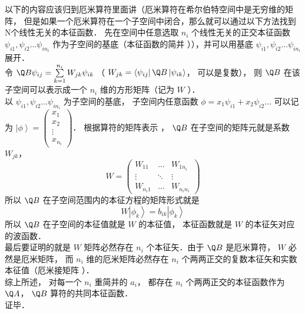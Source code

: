 以下的内容应该归到厄米算符里面讲（厄米算符在希尔伯特空间中是无穷维的矩阵， 但是如果一个厄米算符在一个子空间中闭合，那么就可以通过以下方法找到N个线性无关的本征函数．%
先在空间中任意选取 $n_i$ 个线性无关的正交本征函数 ${\psi _{i1}}, {\psi _{i2}}\dots{\psi _{i{n_i}}}$ 作为子空间的基底（本征函数的简并%
）），并可以用基底 ${\psi _{i1}},{\psi _{i2}}\dots{\psi _{i{n_i}}}$ 展开．\\
令 $\Q B{\psi _{ij}} = \sum\limits_{k = 1}^{{n_i}} {{W_{jk}}{\psi _{ik}}} $ （ ${W_{jk}} = \left\langle {{\psi _{ij}}} \right|\Q B\left| {{\psi _{ik}}} \right\rangle $， 可以是复数）， 则 $\Q B$ 在该子空间可以表示成一个 $n_i$ 维的方形矩阵（记为 $W$ ）．\\
以 ${\psi _{i1}}, {\psi _{i2}}\dots{\psi _{i{n_i}}}$ 为子空间的基底， 子空间内任意函数 $\phi  = {x_1}{\psi _{i1}} + {x_2}{\psi _{i2}}\dots$ 可以记为 $\left| \phi  \right\rangle  = \left( \begin{aligned}
{x_1}\\
{x_2}\\
\vdots \\
{x_{{n_i}}}
\end{aligned} \right)$． 根据算符的矩阵表示%
， $\Q B$ 在子空间的矩阵元就是系数 ${W_{jk}}$， 
\begin{equation}
  W = \left( {\begin{aligned}
{{W_{11}}}& \ldots &{{W_{1{n_i}}}}\\
 \vdots & \ddots & \vdots \\
{{W_{{n_i}1}}}& \ldots &{{W_{{n_i}{n_i}}}}
\end{aligned}} \right)
\end{equation}
所以 $\Q B$ 在子空间范围内的本征方程的矩阵形式就是
\begin{equation}
  W\left| {{\phi _k}} \right\rangle  = {b_{ik}}\left| {{\phi _k}} \right\rangle 
\end{equation}
所以 $\Q B$ 在子空间的本征值就是 $W$ 的本征值， 本征函数就是 $W$ 的本征矢对应的波函数．\\
最后要证明的就是 $W$ 矩阵必然存在 $n_i$ 个本征矢．由于 $\Q B$ 是厄米算符，  $W$ 必然是厄米矩阵， 而 $n_i$ 维的厄米矩阵必然存在 $n_i$ 个两两正交的复数本征矢和实数本征值（厄米接矩阵%
）．\\
综上所述， 对每一个 $n_i$ 重简并的 $a_i$，  都存在 $n_i$ 个两两正交的本征函数作为 $\Q A$，  $\Q B$ 算符的共同本征函数．\\
证毕．\\
